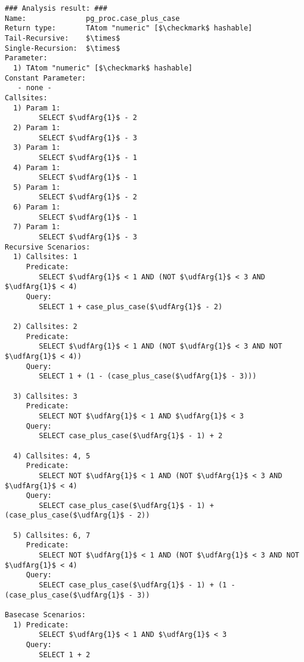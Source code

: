 \begin{lstlisting}[language={},basicstyle=\scriptsize]
### Analysis result: ###
Name:              pg_proc.case_plus_case
Return type:       TAtom "numeric" [$\checkmark$ hashable]
Tail-Recursive:    $\times$
Single-Recursion:  $\times$
Parameter:
  1) TAtom "numeric" [$\checkmark$ hashable]
Constant Parameter:
   - none -
Callsites:
  1) Param 1:
        SELECT $\udfArg{1}$ - 2 
  2) Param 1:
        SELECT $\udfArg{1}$ - 3 
  3) Param 1:
        SELECT $\udfArg{1}$ - 1 
  4) Param 1:
        SELECT $\udfArg{1}$ - 1 
  5) Param 1:
        SELECT $\udfArg{1}$ - 2 
  6) Param 1:
        SELECT $\udfArg{1}$ - 1 
  7) Param 1:
        SELECT $\udfArg{1}$ - 3 
Recursive Scenarios:
  1) Callsites: 1
     Predicate:
        SELECT $\udfArg{1}$ < 1 AND (NOT $\udfArg{1}$ < 3 AND $\udfArg{1}$ < 4)
     Query:
        SELECT 1 + case_plus_case($\udfArg{1}$ - 2)

  2) Callsites: 2
     Predicate:
        SELECT $\udfArg{1}$ < 1 AND (NOT $\udfArg{1}$ < 3 AND NOT $\udfArg{1}$ < 4)) 
     Query:
        SELECT 1 + (1 - (case_plus_case($\udfArg{1}$ - 3)))

  3) Callsites: 3
     Predicate:
        SELECT NOT $\udfArg{1}$ < 1 AND $\udfArg{1}$ < 3
     Query:
        SELECT case_plus_case($\udfArg{1}$ - 1) + 2

  4) Callsites: 4, 5
     Predicate:
        SELECT NOT $\udfArg{1}$ < 1 AND (NOT $\udfArg{1}$ < 3 AND $\udfArg{1}$ < 4) 
     Query:
        SELECT case_plus_case($\udfArg{1}$ - 1) + (case_plus_case($\udfArg{1}$ - 2))

  5) Callsites: 6, 7
     Predicate:
        SELECT NOT $\udfArg{1}$ < 1 AND (NOT $\udfArg{1}$ < 3 AND NOT $\udfArg{1}$ < 4)
     Query:
        SELECT case_plus_case($\udfArg{1}$ - 1) + (1 - (case_plus_case($\udfArg{1}$ - 3))

Basecase Scenarios:
  1) Predicate:
        SELECT $\udfArg{1}$ < 1 AND $\udfArg{1}$ < 3 
     Query:
        SELECT 1 + 2
\end{lstlisting}
